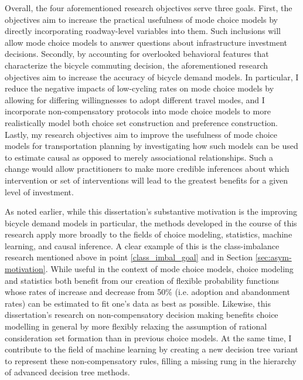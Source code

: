Overall, the four aforementioned research objectives serve three goals. First, the objectives aim to increase the practical usefulness of mode choice models by directly incorporating roadway-level variables into them. Such inclusions will allow mode choice models to answer questions about infrastructure investment decisions. Secondly, by accounting for overlooked behavioral features that characterize the bicycle commuting decision, the aforementioned research objectives aim to increase the accuracy of bicycle demand models. In particular, I reduce the negative impacts of low-cycling rates on mode choice models by allowing for differing willingnesses to adopt different travel modes, and I incorporate non-compensatory protocols into mode choice models to more realistically model both choice set construction and preference construction. Lastly, my research objectives aim to improve the usefulness of mode choice models for transportation planning by investigating how such models can be used to estimate causal as opposed to merely associational relationships. Such a change would allow practitioners to make more credible inferences about which intervention or set of interventions will lead to the greatest benefits for a given level of investment.

As noted earlier, while this dissertation's substantive motivation is the improving bicycle demand models in particular, the methods developed in the course of this research apply more broadly to the fields of choice modeling, statistics, machine learning, and causal inference. A clear example of this is the class-imbalance research mentioned above in point \ref{class_imbal_goal} and in Section \ref{sec:asym-motivation}. While useful in the context of mode choice models, choice modeling and statistics both benefit from our creation of flexible probability functions whose rates of increase and decrease from 50\% (i.e. adoption and abandonment rates) can be estimated to fit one's data as best as possible. Likewise, this dissertation's research on non-compensatory decision making benefits choice modelling in general by more flexibly relaxing the assumption of rational consideration set formation than in previous choice models. At the same time, I contribute to the field of machine learning by creating a new decision tree variant to represent these non-compensatory rules, filling a missing rung in the hierarchy of advanced decision tree methods.

